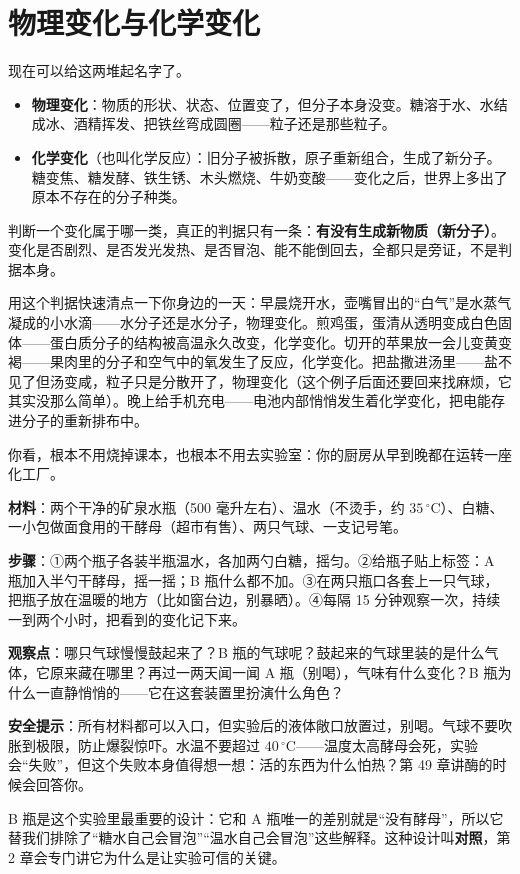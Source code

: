 \section{物理变化与化学变化}

现在可以给这两堆起名字了。

\begin{itemize}[itemsep=2pt]
\item \textbf{物理变化}：物质的形状、状态、位置变了，但分子本身没变。糖溶于水、水结成冰、酒精挥发、把铁丝弯成圆圈——粒子还是那些粒子。
\item \textbf{化学变化}（也叫化学反应）：旧分子被拆散，原子重新组合，生成了新分子。糖变焦、糖发酵、铁生锈、木头燃烧、牛奶变酸——变化之后，世界上多出了原本不存在的分子种类。
\end{itemize}

判断一个变化属于哪一类，真正的判据只有一条：\textbf{有没有生成新物质（新分子）}。变化是否剧烈、是否发光发热、是否冒泡、能不能倒回去，全都只是旁证，不是判据本身。

用这个判据快速清点一下你身边的一天：早晨烧开水，壶嘴冒出的“白气”是水蒸气凝成的小水滴——水分子还是水分子，物理变化。煎鸡蛋，蛋清从透明变成白色固体——蛋白质分子的结构被高温永久改变，化学变化。切开的苹果放一会儿变黄变褐——果肉里的分子和空气中的氧发生了反应，化学变化。把盐撒进汤里——盐不见了但汤变咸，粒子只是分散开了，物理变化（这个例子后面还要回来找麻烦，它其实没那么简单）。晚上给手机充电——电池内部悄悄发生着化学变化，把电能存进分子的重新排布中。

你看，根本不用烧掉课本，也根本不用去实验室：你的厨房从早到晚都在运转一座化工厂。

\begin{shiyan}
\textbf{材料}：两个干净的矿泉水瓶（500 毫升左右）、温水（不烫手，约 $35\,^{\circ}\mathrm{C}$）、白糖、一小包做面食用的干酵母（超市有售）、两只气球、一支记号笔。

\textbf{步骤}：①两个瓶子各装半瓶温水，各加两勺白糖，摇匀。②给瓶子贴上标签：A 瓶加入半勺干酵母，摇一摇；B 瓶什么都不加。③在两只瓶口各套上一只气球，把瓶子放在温暖的地方（比如窗台边，别暴晒）。④每隔 15 分钟观察一次，持续一到两个小时，把看到的变化记下来。

\textbf{观察点}：哪只气球慢慢鼓起来了？B 瓶的气球呢？鼓起来的气球里装的是什么气体，它原来藏在哪里？再过一两天闻一闻 A 瓶（别喝），气味有什么变化？B 瓶为什么一直静悄悄的——它在这套装置里扮演什么角色？

\textbf{安全提示}：所有材料都可以入口，但实验后的液体敞口放置过，别喝。气球不要吹胀到极限，防止爆裂惊吓。水温不要超过 $40\,^{\circ}\mathrm{C}$——温度太高酵母会死，实验会“失败”，但这个失败本身值得想一想：活的东西为什么怕热？第 49 章讲酶的时候会回答你。

B 瓶是这个实验里最重要的设计：它和 A 瓶唯一的差别就是“没有酵母”，所以它替我们排除了“糖水自己会冒泡”“温水自己会冒泡”这些解释。这种设计叫\textbf{对照}，第 2 章会专门讲它为什么是让实验可信的关键。
\end{shiyan}

